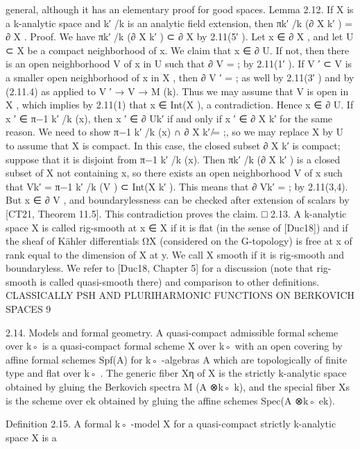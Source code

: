 \documentclass[
  10pt,
]{article}
\newenvironment{Shaded}{}{}
\newcommand{\NormalTok}[1]{#1}
\begin{document}
\begin{Shaded}
\begin{Highlighting}[]
\NormalTok{general, although it has an elementary proof for good spaces.}
\NormalTok{Lemma 2.12. If X is a k{-}analytic space and k′ /k is an analytic field extension, then}
\NormalTok{                                          πk′ /k (∂ X k′ ) = ∂ X .}
\NormalTok{Proof. We have πk′ /k (∂ X k′ ) ⊂ ∂ X by 2.11(5′ ). Let x ∈ ∂ X , and let U ⊂ X be a compact}
\NormalTok{neighborhood of x. We claim that x ∈ ∂ U. If not, then there is an open neighborhood}
\NormalTok{V of x in U such that ∂ V = ; by 2.11(1′ ). If V ′ ⊂ V is a smaller open neighborhood of}
\NormalTok{x in X , then ∂ V ′ = ; as well by 2.11(3′ ) and by (2.11.4) as applied to V ′ → V → M (k).}
\NormalTok{Thus we may assume that V is open in X , which implies by 2.11(1) that x ∈ Int(X ), a}
\NormalTok{contradiction. Hence x ∈ ∂ U. If x ′ ∈ π−1      k′ /k}
\NormalTok{                                                      (x), then x ′ ∈ ∂ Uk′ if and only if x ′ ∈ ∂ X k′}
\NormalTok{for the same reason. We need to show π−1        k′ /k}
\NormalTok{                                                      (x) ∩ ∂ X k′ ̸= ;, so we may replace X by U to}
\NormalTok{assume that X is compact. In this case, the closed subset ∂ X k′ is compact; suppose that}
\NormalTok{it is disjoint from π−1}
\NormalTok{                      k′ /k}
\NormalTok{                            (x). Then πk′ /k (∂ X k′ ) is a closed subset of X not containing x, so}
\NormalTok{there exists an open neighborhood V of x such that Vk′ = π−1            k′ /k}
\NormalTok{                                                                              (V ) ⊂ Int(X k′ ). This means}
\NormalTok{that ∂ Vk′ = ; by 2.11(3,4). But x ∈ ∂ V , and boundarylessness can be checked after}
\NormalTok{extension of scalars by [CT21, Theorem 11.5]. This contradiction proves the claim. □}
\NormalTok{2.13. A k{-}analytic space X is called rig{-}smooth at x ∈ X if it is flat (in the sense of}
\NormalTok{[Duc18]) and if the sheaf of Kähler differentials ΩX (considered on the G{-}topology) is}
\NormalTok{free at x of rank equal to the dimension of X at y. We call X smooth if it is rig{-}smooth}
\NormalTok{and boundaryless. We refer to [Duc18, Chapter 5] for a discussion (note that rig{-}smooth}
\NormalTok{is called quasi{-}smooth there) and comparison to other definitions.}
\NormalTok{             CLASSICALLY PSH AND PLURIHARMONIC FUNCTIONS ON BERKOVICH SPACES                9}

\NormalTok{2.14. Models and formal geometry. A quasi{-}compact admissible formal scheme over}
\NormalTok{k◦ is a quasi{-}compact formal scheme X over k◦ with an open covering by affine formal}
\NormalTok{schemes Spf(A) for k◦ {-}algebras A which are topologically of finite type and flat over k◦ .}
\NormalTok{The generic fiber Xη of X is the strictly k{-}analytic space obtained by gluing the Berkovich}
\NormalTok{spectra M (A ⊗k◦ k), and the special fiber Xs is the scheme over ek obtained by gluing the}
\NormalTok{affine schemes Spec(A ⊗k◦ ek).}

\NormalTok{Definition 2.15. A formal k◦ {-}model X for a quasi{-}compact strictly k{-}analytic space X is a}
\end{Highlighting}
\end{Shaded}
\end{document}
